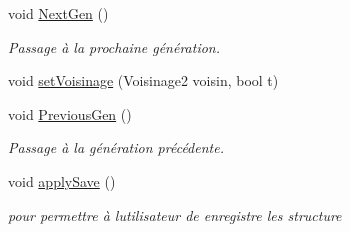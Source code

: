 \begin{DoxyCompactItemize}
void \mbox{\hyperlink{class_simulation2_a15b6e3294aeb571c31ea98e80b0f061e}{Next\+Gen}} ()
\begin{DoxyCompactList}\small\item\em Passage à la prochaine génération. \end{DoxyCompactList}\item 
void \mbox{\hyperlink{class_simulation2_a38cbad0a856c0163b19960e72842363d}{set\+Voisinage}} (Voisinage2 voisin, bool t)
\item 
void \mbox{\hyperlink{class_simulation2_addae6faec11353c1a1184c535cf3764c}{Previous\+Gen}} ()
\begin{DoxyCompactList}\small\item\em Passage à la génération précédente. \end{DoxyCompactList}\item 
void \mbox{\hyperlink{class_simulation2_a5a15f114f03b61aec33f641c49e0734c}{apply\+Save}} ()
\begin{DoxyCompactList}\small\item\em pour permettre à l\textquotesingle{}utilisateur de enregistre les structure \end{DoxyCompactList}\end{DoxyCompactItemize}
